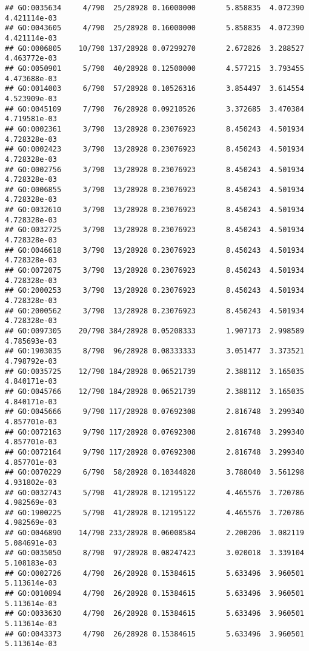 \documentclass[
]{article}
\begin{document}
\begin{verbatim}
## GO:0035634     4/790  25/28928 0.16000000       5.858835  4.072390 4.421114e-03
## GO:0043605     4/790  25/28928 0.16000000       5.858835  4.072390 4.421114e-03
## GO:0006805    10/790 137/28928 0.07299270       2.672826  3.288527 4.463772e-03
## GO:0050901     5/790  40/28928 0.12500000       4.577215  3.793455 4.473688e-03
## GO:0014003     6/790  57/28928 0.10526316       3.854497  3.614554 4.523909e-03
## GO:0045109     7/790  76/28928 0.09210526       3.372685  3.470384 4.719581e-03
## GO:0002361     3/790  13/28928 0.23076923       8.450243  4.501934 4.728328e-03
## GO:0002423     3/790  13/28928 0.23076923       8.450243  4.501934 4.728328e-03
## GO:0002756     3/790  13/28928 0.23076923       8.450243  4.501934 4.728328e-03
## GO:0006855     3/790  13/28928 0.23076923       8.450243  4.501934 4.728328e-03
## GO:0032610     3/790  13/28928 0.23076923       8.450243  4.501934 4.728328e-03
## GO:0032725     3/790  13/28928 0.23076923       8.450243  4.501934 4.728328e-03
## GO:0046618     3/790  13/28928 0.23076923       8.450243  4.501934 4.728328e-03
## GO:0072075     3/790  13/28928 0.23076923       8.450243  4.501934 4.728328e-03
## GO:2000253     3/790  13/28928 0.23076923       8.450243  4.501934 4.728328e-03
## GO:2000562     3/790  13/28928 0.23076923       8.450243  4.501934 4.728328e-03
## GO:0097305    20/790 384/28928 0.05208333       1.907173  2.998589 4.785693e-03
## GO:1903035     8/790  96/28928 0.08333333       3.051477  3.373521 4.798792e-03
## GO:0035725    12/790 184/28928 0.06521739       2.388112  3.165035 4.840171e-03
## GO:0045766    12/790 184/28928 0.06521739       2.388112  3.165035 4.840171e-03
## GO:0045666     9/790 117/28928 0.07692308       2.816748  3.299340 4.857701e-03
## GO:0072163     9/790 117/28928 0.07692308       2.816748  3.299340 4.857701e-03
## GO:0072164     9/790 117/28928 0.07692308       2.816748  3.299340 4.857701e-03
## GO:0070229     6/790  58/28928 0.10344828       3.788040  3.561298 4.931802e-03
## GO:0032743     5/790  41/28928 0.12195122       4.465576  3.720786 4.982569e-03
## GO:1900225     5/790  41/28928 0.12195122       4.465576  3.720786 4.982569e-03
## GO:0046890    14/790 233/28928 0.06008584       2.200206  3.082119 5.084691e-03
## GO:0035050     8/790  97/28928 0.08247423       3.020018  3.339104 5.108183e-03
## GO:0002726     4/790  26/28928 0.15384615       5.633496  3.960501 5.113614e-03
## GO:0010894     4/790  26/28928 0.15384615       5.633496  3.960501 5.113614e-03
## GO:0033630     4/790  26/28928 0.15384615       5.633496  3.960501 5.113614e-03
## GO:0043373     4/790  26/28928 0.15384615       5.633496  3.960501 5.113614e-03

\end{verbatim}
\end{document}

